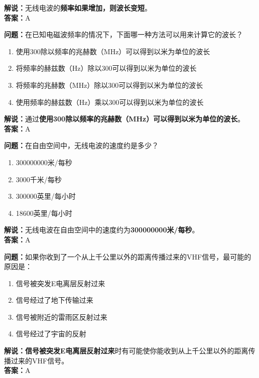 \textbf{解说：}无线电波的\textbf{频率如果增加，则波长变短}。\\\textbf{答案：}A



\textbf{问题：}在已知电磁波频率的情况下，下面哪一种方法可以用来计算它的波长？

\begin{enumerate}[label=\Alph*), leftmargin=1cm]
	\item 使用300除以频率的兆赫数（MHz）可以得到以米为单位的波长
	\item 将频率的赫兹数（Hz）除以300可以得到以米为单位的波长
	\item 将频率的兆赫数（MHz）除以300可以得到以米为单位的波长
	\item 使用频率的赫兹数（Hz）乘以300可以得到以米为单位的波长
\end{enumerate}

\textbf{解说：}通过\textbf{使用300除以频率的兆赫数（MHz）可以得到以米为单位的波长}。\\\textbf{答案：}A



\textbf{问题：}在自由空间中，无线电波的速度约是多少？

\begin{enumerate}[label=\Alph*), leftmargin=1cm]
	\item 300000000米/每秒
	\item 3000千米/每秒
	\item 300000英里/每小时
	\item 18600英里/每小时
\end{enumerate}

\textbf{解说：}无线电波在自由空间中的速度约为\textbf{300000000米/每秒}。\\\textbf{答案：}A



\textbf{问题：}如果你收到了一个从上千公里以外的距离传播过来的VHF信号，最可能的原因是：

\begin{enumerate}[label=\Alph*), leftmargin=1cm]
	\item 信号被突发E电离层反射过来
	\item 信号经过了地下传输过来
	\item 信号被附近的雷雨区反射过来
	\item 信号经过了宇宙的反射
\end{enumerate}

\textbf{解说：信号被突发E电离层反射过来}时有可能使你能收到从上千公里以外的距离传播过来的VHF信号。\\\textbf{答案：}A



